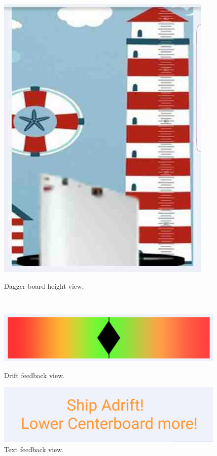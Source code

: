 \begin{figure}[H]
	\centering
	\begin{minipage}[c]{0.35\textwidth}
	\includegraphics[width=\textwidth]{Figures/height.jpg}
	\caption{Dagger-board height view.}
	\label{feedback-height}
	\end{minipage}
	~
	\begin{minipage}[c]{0.55\textwidth}
	\includegraphics[width=\textwidth]{Figures/drift.png}
	\caption{Drift feedback view.}
	\label{feedback-drift}
	
	\includegraphics[width=\textwidth]{Figures/text.png}
	\caption{Text feedback view.}
	\label{feedback-text}
	\end{minipage}
\end{figure}
